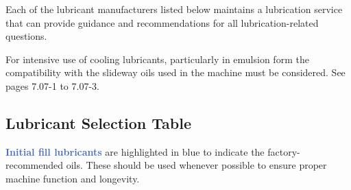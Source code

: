 
Each of the lubricant manufacturers listed below maintains a lubrication service that can provide guidance and recommendations for all lubrication-related questions.

For intensive use of cooling lubricants, particularly in emulsion form the compatibility with the slideway oils used in the machine must be considered. See pages 7.07-1 to 7.07-3.

\newpage
\subsection{Lubricant Selection Table}

\textcolor{RoyalBlue}{\textbf{Initial fill lubricants}} are highlighted in blue to indicate the factory-recommended oils. These should be used whenever possible to ensure proper machine function and longevity.


